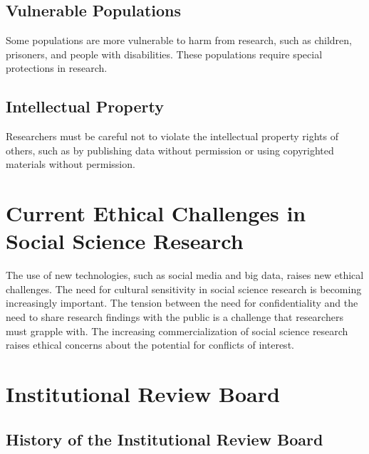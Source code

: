 \documentclass[
  b5paper]{book}
\begin{document}
\hypertarget{vulnerable-populations}{%
\subsection*{Vulnerable Populations}\label{vulnerable-populations}}

Some populations are more vulnerable to harm from research, such as children, prisoners, and people with disabilities. These populations require special protections in research.

\hypertarget{intellectual-property}{%
\subsection*{Intellectual Property}\label{intellectual-property}}

Researchers must be careful not to violate the intellectual property rights of others, such as by publishing data without permission or using copyrighted materials without permission.

\hypertarget{current-ethical-challenges-in-social-science-research}{%
\section{Current Ethical Challenges in Social Science Research}\label{current-ethical-challenges-in-social-science-research}}

The use of new technologies, such as social media and big data, raises new ethical challenges. The need for cultural sensitivity in social science research is becoming increasingly important. The tension between the need for confidentiality and the need to share research findings with the public is a challenge that researchers must grapple with. The increasing commercialization of social science research raises ethical concerns about the potential for conflicts of interest.

\hypertarget{institutional-review-board}{%
\section{Institutional Review Board}\label{institutional-review-board}}

\hypertarget{history-of-the-institutional-review-board}{%
\subsection*{History of the Institutional Review Board}\label{history-of-the-institutional-review-board}}
\end{document}
